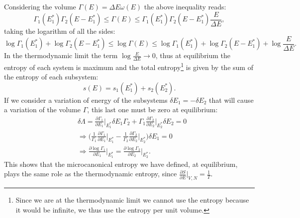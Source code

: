 Considering the volume $\Gamma(E)=\Delta E\omega(E)$ the above inequality reads:
\begin{equation*}
    \Gamma_1(E_1^*)\Gamma_2(E-E_1^*)\leq\Gamma(E)\leq\Gamma_1(E_1^*)\Gamma_2(E-E_1^*)\frac{E}{\Delta E},
\end{equation*}
taking the logarithm of all the sides:
\begin{equation*}
    \log\Gamma_1(E_1^*)+\log\Gamma_2(E-E_1^*)\leq\log\Gamma(E)\leq\log\Gamma_1(E_1^*)+\log\Gamma_2(E-E_1^*)+\log\frac{E}{\Delta E}.
\end{equation*}
In the thermodynamic limit the term $\log\frac{E}{\Delta E}\rightarrow0$, thus at equilibrium the entropy of each system is maximum and the total entropy\footnote{Since we are at the thermodynamic limit we cannot use the entropy because it would be infinite, we thus use the entropy per unit volume.} is given by the sum of the entropy of each subsystem:
\begin{equation*}
    s(E)=s_1(E_1^*)+s_2(E_2^*).
\end{equation*} 
If we consider a variation of energy of the subsystems $\delta E_1=-\delta E_2$ that will cause a variation of the volume $\Gamma$, this last one must be zero at equilibrium:
\begin{align*}
    &\delta \Lambda= \frac{\partial \Gamma_1}{\partial E_1}\bigg|_{E_1^*}\delta E_1 \Gamma_2+\Gamma_1\frac{\partial \Gamma_2}{\partial E_2}\bigg|_{E_2^*}\delta E_2=0\\&
    \Rightarrow\bigg(\frac{1}{\Gamma_1}\frac{\partial \Gamma_1}{\partial E_1}\bigg|_{E_1^*}-\frac{1}{\Gamma_2}\frac{\partial \Gamma_2}{\partial E_2}\bigg|_{E_2^*}\bigg)\delta E_1=0
    \\&
    \Rightarrow\frac{\partial \log\Gamma_1}{\partial E_1}\bigg|_{E_1^*}=\frac{\partial \log\Gamma_2}{\partial E_2}\bigg|_{E_2^*}\bigg. 
\end{align*}
This shows that the microcanonical entropy we have defined, at equilibrium, plays the same role as the thermodynamic entropy, since $\frac{\partial S}{\partial E}\big|_{V,N}=\frac{1}{T}$.\\

